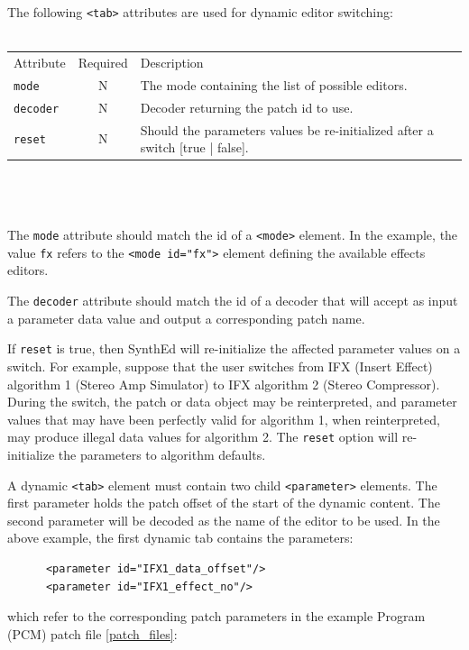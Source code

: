 \documentclass[a4paper,twoside,12pt]{article}
\newcommand{\code}[1]{\color{red}\texttt{#1}\color{black}}
\begin{document}
The following \code{<tab>}{} attributes are used for dynamic
editor switching:
\\
\\
\begin{tabular}{|l|c|p{9cm}|}
\hline
Attribute & Required & Description \\
\code{mode} & N & The mode containing the list of possible editors. \\
\code{decoder} & N & Decoder returning the patch id to use.  \\
\code{reset} & N & Should the parameters values be re-initialized
after a switch [true | false]. \\
\hline
\end{tabular}
\\
\\
\\
The \code{mode}{} attribute should match the id of a
\code{<mode>}{} element. In the example, the value \code{fx}{}
refers to the \code{<mode id="fx">}{} element defining the
available effects editors.

The \code{decoder}{} attribute should match the id of a decoder that
will accept as input a parameter data value and output a corresponding
patch name.

If \code{reset}{} is true, then SynthEd will re-initialize the
affected parameter values on a switch. For example, suppose that
the user switches from IFX (Insert Effect) algorithm 1 (Stereo Amp
Simulator) to IFX algorithm 2 (Stereo Compressor). During the
switch, the patch or data object may be reinterpreted, and
parameter values that may have been perfectly valid for algorithm
1, when reinterpreted, may produce illegal data values for
algorithm 2. The \code{reset}{} option will re-initialize the
parameters to algorithm defaults.

A dynamic \code{<tab>}{} element must contain two child
\code{<parameter>}{} elements. The first parameter holds the patch
offset of the start of the dynamic content. The second parameter
will be decoded as the name of the editor to be used. In the above
example, the first dynamic tab contains the parameters:

\begin{verbatim}
      <parameter id="IFX1_data_offset"/>
      <parameter id="IFX1_effect_no"/>
\end{verbatim}

which refer to the corresponding patch parameters in the example
Program (PCM) patch file \ref{patch_files}:
\end{document}
